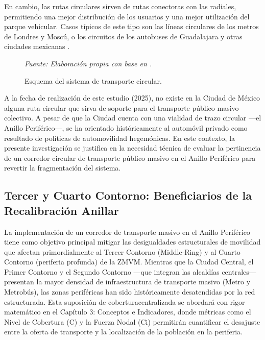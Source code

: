 En cambio, las rutas circulares sirven de rutas conectoras con las radiales,
permitiendo una mejor distribución de los usuarios y una mejor utilización del parque
vehicular. Casos típicos de este tipo son las líneas circulares de los metros de
Londres y Moscú, o los circuitos de los autobuses de Guadalajara y otras ciudades
mexicanas \parencite{molinero2002}.

\begin{figure}[htbp]
    \centering
    \caption[Esquema de transporte circular]{Esquema del sistema de transporte
    circular.}
    \label{fig:transporte-circular}
    \small\textit{Fuente: Elaboración propia con base en \textcite{molinero2002}.}
\end{figure}

A la fecha de realización de este estudio (2025), no existe en la Ciudad de México alguna ruta circular 
que sirva de soporte para el transporte público masivo colectivo. A pesar de que la Ciudad cuenta 
con una vialidad de trazo circular —el Anillo Periférico—, \DIFdelbegin {}\DIFdelend \DIFaddbegin {}\DIFaddend se ha orientado históricamente al automóvil 
privado como resultado de políticas de automovilidad hegemónicas. En este contexto, la presente investigación 
se justifica en la necesidad técnica de evaluar la pertinencia de un corredor circular de transporte público 
masivo en el Anillo Periférico para revertir la fragmentación del sistema.

\subsection{Tercer y Cuarto Contorno: Beneficiarios de la Recalibración Anillar} \label{subsec:beneficiarios-contornos}
La implementación de un corredor de transporte masivo en el Anillo Periférico tiene como objetivo principal mitigar las 
desigualdades estructurales de movilidad que afectan primordialmente al Tercer Contorno (Middle-Ring) y al Cuarto Contorno 
(periferia profunda) de la ZMVM. Mientras que la Ciudad Central, el Primer Contorno y el Segundo Contorno 
—que integran las alcaldías centrales— presentan la mayor densidad de infraestructura de transporte masivo (Metro y Metrobús), 
las zonas periféricas han sido históricamente desatendidas por la red estructurada. Esta \DIFdelbegin {}\DIFdelend \DIFaddbegin {}\DIFaddend suposición de cobertura\DIFdelbegin {}\DIFdelend \DIFaddbegin {}\DIFaddend centralizada se
abordará con rigor matemático en el Capítulo 3: Conceptos e Indicadores, donde métricas como el Nivel de Cobertura (C) y la Fuerza Nodal (Ci) 
permitirán cuantificar el desajuste entre la oferta de transporte y la localización de la población en la periferia.

